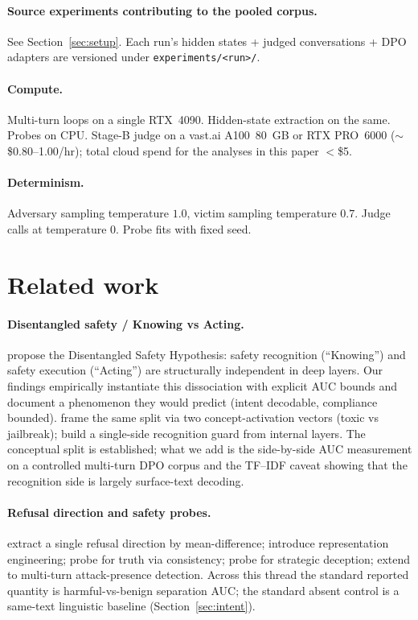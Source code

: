 \documentclass[11pt]{article}
\begin{document}
\paragraph{Source experiments contributing to the pooled corpus.}
See Section~\ref{sec:setup}. Each run's hidden states + judged conversations + DPO adapters are versioned under \texttt{experiments/<run>/}.

\paragraph{Compute.}
Multi-turn loops on a single RTX~4090. Hidden-state extraction on the same. Probes on CPU. Stage-B judge on a vast.ai A100~80~GB or RTX PRO~6000 ($\sim$\$0.80--1.00/hr); total cloud spend for the analyses in this paper $<$\$5.

\paragraph{Determinism.}
Adversary sampling temperature $1.0$, victim sampling temperature $0.7$. Judge calls at temperature $0$. Probe fits with fixed seed.


\section{Related work}
\label{sec:related}

\paragraph{Disentangled safety / Knowing vs Acting.}
\citet{wu2026knowingwithoutacting} propose the Disentangled Safety Hypothesis: safety recognition (``Knowing'') and safety execution (``Acting'') are structurally independent in deep layers. Our findings empirically instantiate this dissociation with explicit AUC bounds and document a phenomenon they would predict (intent decodable, compliance bounded). \citet{zhang2025jbshield} frame the same split via two concept-activation vectors (toxic vs jailbreak); \citet{jiao2026siren} build a single-side recognition guard from internal layers. The conceptual split is established; what we add is the side-by-side AUC measurement on a controlled multi-turn DPO corpus and the TF--IDF caveat showing that the recognition side is largely surface-text decoding.

\paragraph{Refusal direction and safety probes.}
\citet{arditi2024refusal} extract a single refusal direction by mean-difference; \citet{zou2023repe} introduce representation engineering; \citet{burns2023ccs} probe for truth via consistency; \citet{goldowsky2025deception} probe for strategic deception; \citet{kulkarni2026latent} extend to multi-turn attack-presence detection. Across this thread the standard reported quantity is harmful-vs-benign separation AUC; the standard absent control is a same-text linguistic baseline (Section~\ref{sec:intent}).
\end{document}
